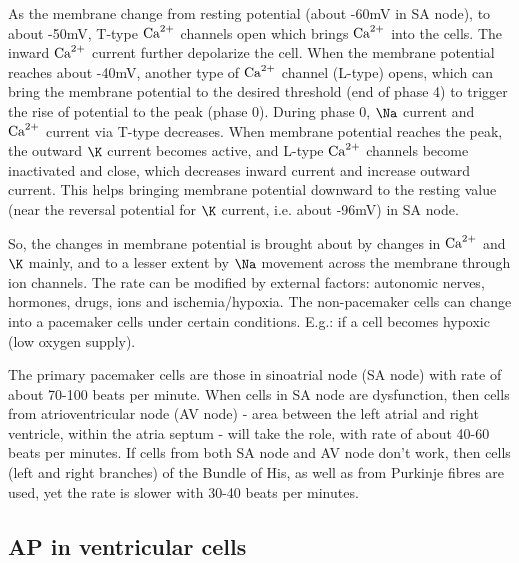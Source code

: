 As the membrane change from resting potential (about -60mV in SA node), to about
-50mV, T-type ${\text{Ca}^{2+}}$ channels open which brings ${\text{Ca}^{2+}}$ into the cells. The inward
${\text{Ca}^{2+}}$ current further depolarize the cell. When the membrane potential reaches
about -40mV, another type of ${\text{Ca}^{2+}}$ channel (L-type) opens, which can bring the
membrane potential to the desired threshold (end of phase 4) to trigger the rise
of potential to the peak (phase 0). During phase 0, $\Na$ current and ${\text{Ca}^{2+}}$
current via T-type decreases. When membrane potential reaches the peak, the
outward $\K$ current becomes active, and L-type ${\text{Ca}^{2+}}$ channels become
inactivated and close, which decreases inward current and increase outward
current. This helps bringing membrane potential downward to the resting
value (near the reversal potential for $\K$ current, i.e. about -96mV) in SA
node.

So, the changes in membrane potential is brought about by changes in ${\text{Ca}^{2+}}$ and
$\K$ mainly, and to a lesser extent by $\Na$ movement across the membrane
through ion channels. The rate can be modified by external factors: autonomic
nerves, hormones, drugs, ions and ischemia/hypoxia. The non-pacemaker cells can
change into a pacemaker cells under certain conditions. E.g.: if a cell becomes
hypoxic (low oxygen supply).

\begin{framed}
  
  The primary pacemaker cells are those in sinoatrial node (SA node)
  with rate of about 70-100 beats per minute.  When cells in SA node are
  dysfunction, then cells from atrioventricular node (AV node) - area
  between the left atrial and right ventricle, within the atria septum -
  will take the role, with rate of about 40-60 beats per minutes. If
  cells from both SA node and AV node don't work, then cells (left and
  right branches) of the Bundle of His, as well as from Purkinje fibres
  are used, yet the rate is slower with 30-40 beats per minutes. 
\end{framed}
% 

\subsection{AP in ventricular cells}
\label{sec:AP-ventricular-myocyte}

